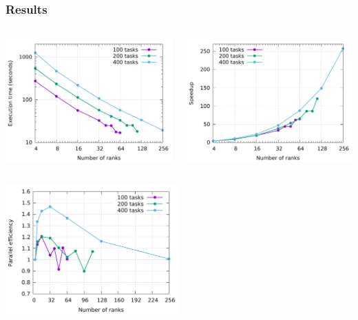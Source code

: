 \documentclass{beamer}
\begin{document}
\begin{frame}
  \frametitle{Results}

  \centering
  \begin{columns}
    \begin{column}{0.5\textwidth}
      \includegraphics[width=\textwidth]{Imagens/exectime.pdf}
    \end{column}
    \begin{column}{0.5\textwidth}
      \includegraphics[width=\textwidth]{Imagens/speedup.pdf}
    \end{column}
  \end{columns}
  \includegraphics[width=0.5\textwidth]{Imagens/efficiency.pdf}
\end{frame}
\end{document}
